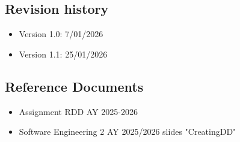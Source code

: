 \subsection{Revision history}
\begin{itemize}
    \item Version 1.0: 7/01/2026
    \item Version 1.1: 25/01/2026
\end{itemize}
\subsection{Reference Documents}
\begin{itemize}
    \item Assignment RDD AY 2025-2026
    \item Software Engineering 2 AY 2025/2026 slides "CreatingDD"
\end{itemize}


